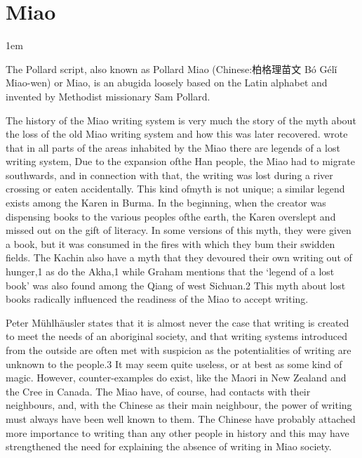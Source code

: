 
\newfontfamily{}


\section{Miao}
\label{s:miao}
\parindent1em

The Pollard script, also known as Pollard Miao (Chinese:{\pan 柏格理苗文 Bó Gélǐ} Miao-wen) or Miao, is an abugida loosely based on the Latin alphabet and invented by Methodist missionary Sam Pollard. 

The history of the Miao writing system is very much the story of the myth about the loss of the old Miao writing
system and how this was later recovered. wrote that in all parts of the areas inhabited by the Miao there are
legends of a lost writing system, Due to the expansion ofthe Han people, the Miao
had to migrate southwards, and in connection with that, the writing was
lost during a river crossing or eaten accidentally.
This kind ofmyth is not unique; a similar legend exists among the Karen
in Burma. In the beginning, when the creator was dispensing books to the
various peoples ofthe earth, the Karen overslept and missed out on the gift
of literacy. In some versions of this myth, they were given a book, but it
was consumed in the fires with which they bum their swidden fields. The
Kachin also have a myth that they devoured their own writing out of
hunger,1 as do the Akha,1 while Graham mentions that the ‘legend of a
lost book’ was also found among the Qiang of west Sichuan.2 This myth
about lost books radically influenced the readiness of the Miao to accept
writing.

Peter Mühlhäusler states that it is almost never the case that writing is
created to meet the needs of an aboriginal society, and that writing systems
introduced from the outside are often met with suspicion as the potentialities
of writing are unknown to the people.3 It may seem quite useless, or at
best as some kind of magic. However, counter-examples do exist, like the
Maori in New Zealand and the Cree in Canada. The Miao have, of course,
had contacts with their neighbours, and, with the Chinese as their main
neighbour, the power of writing must always have been well known to
them. The Chinese have probably attached more importance to writing
than any other people in history and this may have strengthened the need
for explaining the absence of writing in Miao society. 

